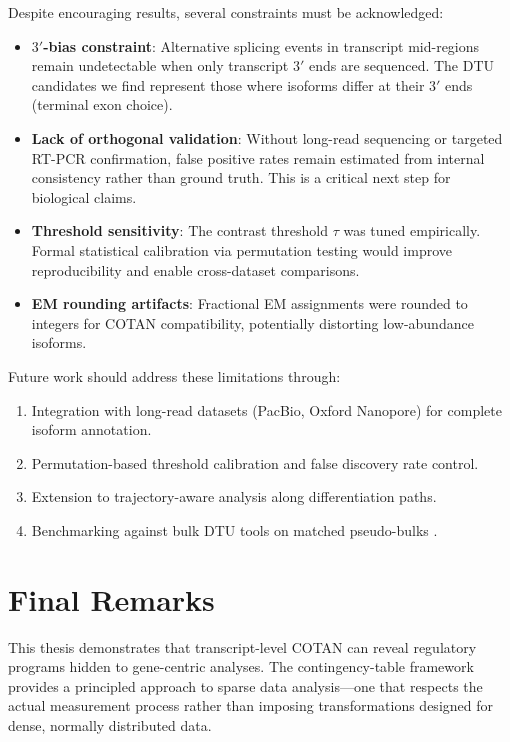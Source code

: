 Despite encouraging results, several constraints must be acknowledged:
\begin{itemize}
    \item \textbf{$3'$-bias constraint}: Alternative splicing events in transcript mid-regions remain undetectable when only transcript $3'$ ends are sequenced. The DTU candidates we find represent those where isoforms differ at their $3'$ ends (terminal exon choice).

    \item \textbf{Lack of orthogonal validation}: Without long-read sequencing or targeted RT-PCR confirmation, false positive rates remain estimated from internal consistency rather than ground truth. This is a critical next step for biological claims.

    \item \textbf{Threshold sensitivity}: The contrast threshold $\tau$ was tuned empirically. Formal statistical calibration via permutation testing would improve reproducibility and enable cross-dataset comparisons.

    \item \textbf{EM rounding artifacts}: Fractional EM assignments were rounded to integers for COTAN compatibility, potentially distorting low-abundance isoforms.
\end{itemize}

Future work should address these limitations through:
\begin{enumerate}
    \item Integration with long-read datasets (PacBio, Oxford Nanopore) for complete isoform annotation.
    \item Permutation-based threshold calibration and false discovery rate control.
    \item Extension to trajectory-aware analysis along differentiation paths.
    \item Benchmarking against bulk DTU tools on matched pseudo-bulks \cite{love2018swimming, draper2025selecting}.
\end{enumerate}

\section*{Final Remarks}

This thesis demonstrates that transcript-level COTAN can reveal regulatory programs hidden to gene-centric analyses. The contingency-table framework provides a principled approach to sparse data analysis---one that respects the actual measurement process rather than imposing transformations designed for dense, normally distributed data.

